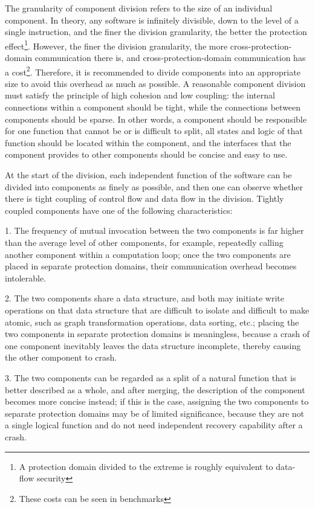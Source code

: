 The granularity of component division refers to the size of an individual component. In theory, any software is infinitely divisible, down to the level of a single instruction, and the finer the division granularity, the better the protection effect\footnote{A protection domain divided to the extreme is roughly equivalent to data-flow security}. However, the finer the division granularity, the more cross-protection-domain communication there is, and cross-protection-domain communication has a cost\footnote{These costs can be seen in benchmarks}. Therefore, it is recommended to divide components into an appropriate size to avoid this overhead as much as possible. A reasonable component division must satisfy the principle of high cohesion and low coupling: the internal connections within a component should be tight, while the connections between components should be sparse. In other words, a component should be responsible for one function that cannot be or is difficult to split, all states and logic of that function should be located within the component, and the interfaces that the component provides to other components should be concise and easy to use.

At the start of the division, each independent function of the software can be divided into components as finely as possible, and then one can observe whether there is tight coupling of control flow and data flow in the division. Tightly coupled components have one of the following characteristics:

1.
The frequency of mutual invocation between the two components is far higher than the average level of other components, for example, repeatedly calling another component within a computation loop; once the two components are placed in separate protection domains, their communication overhead becomes intolerable.

2.
The two components share a data structure, and both may initiate write operations on that data structure that are difficult to isolate and difficult to make atomic, such as graph transformation operations, data sorting, etc.; placing the two components in separate protection domains is meaningless, because a crash of one component inevitably leaves the data structure incomplete, thereby causing the other component to crash.

3.
The two components can be regarded as a split of a natural function that is better described as a whole, and after merging, the description of the component becomes more concise instead; if this is the case, assigning the two components to separate protection domains may be of limited significance, because they are not a single logical function and do not need independent recovery capability after a crash.

